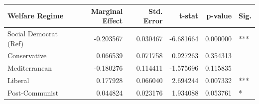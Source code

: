 \begin{tabular}{lrrrrl}
\toprule
Welfare Regime & Marginal Effect & Std. Error & t-stat & p-value & Sig. \\
\midrule
Social Democrat (Ref) & -0.203567 & 0.030467 & -6.681664 & 0.000000 & *** \\
Conservative & 0.066539 & 0.071758 & 0.927263 & 0.354313 &  \\
Mediterranean & -0.180276 & 0.114411 & -1.575696 & 0.115835 &  \\
Liberal & 0.177928 & 0.066040 & 2.694244 & 0.007332 & *** \\
Post-Communist & 0.044824 & 0.023176 & 1.934088 & 0.053761 & * \\
\bottomrule
\end{tabular}
